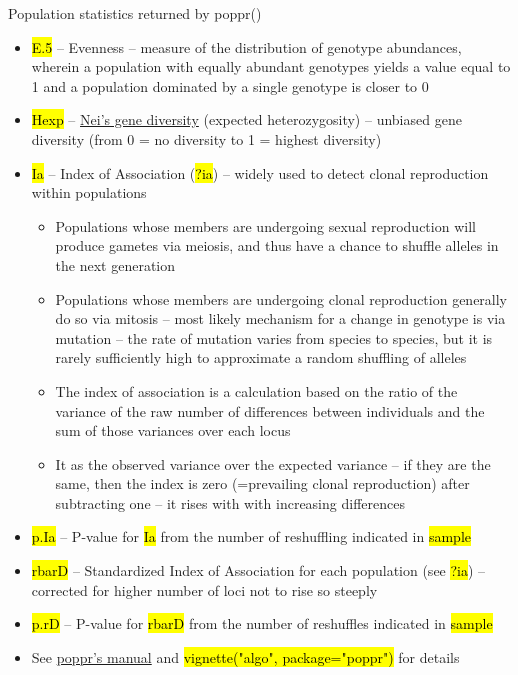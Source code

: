 \documentclass[compress, ucs, xelatex, 11pt, xcolor=svgnames,
  hyperref={
    bookmarks=true,
    unicode=true,
    colorlinks=true,
    pdftitle={Molecular data in R},
    plainpages=false,
    pdfauthor={Vojtech Zeisek},
    pdfsubject={Course about phylogeny and evolution in R},
    pdfcreator={XeLaTeX},
    pdfkeywords={R, evolution, phylogeny, molecular data},
    linkcolor=Tomato,
    anchorcolor=SaddleBrown,
    citecolor=Goldenrod,
    filecolor=DarkMagenta,
    menucolor=Sienna,
    urlcolor=DarkTurquoise,
    pdftex},
  url={hyphens, lowtilde} %
  ]{beamer}
\renewcommand{\texttt}[1]{\hl{\ttfamily #1}}
\begin{document}
\begin{frame}[allowframebreaks]{Population statistics returned by poppr()}
\begin{itemize}
    \item \texttt{E.5} -- Evenness -- measure of the distribution of genotype abundances, wherein a population with equally abundant genotypes yields a value equal to 1 and a population dominated by a single genotype is closer to 0
    \item \texttt{Hexp} -- \href{http://www.genetics.org/content/89/3/583}{Nei's gene diversity} (expected heterozygosity) -- unbiased gene diversity (from 0 = no diversity to 1 = highest diversity)
    \item \texttt{Ia} -- Index of Association (\texttt{?ia}) -- widely used to detect clonal reproduction within populations
    \begin{itemize}
      \item Populations whose members are undergoing sexual reproduction will produce gametes via meiosis, and thus have a chance to shuffle alleles in the next generation
      \item Populations whose members are undergoing clonal reproduction generally do so via mitosis -- most likely mechanism for a change in genotype is via mutation -- the rate of mutation varies from species to species, but it is rarely sufficiently high to approximate a random shuffling of alleles
      \item The index of association is a calculation based on the ratio of the variance of the raw number of differences between individuals and the sum of those variances over each locus
      \item It as the observed variance over the expected variance -- if they are the same, then the index is zero (=prevailing clonal reproduction) after subtracting one -- it rises with with increasing differences
    \end{itemize}
    \item \texttt{p.Ia} -- P-value for \texttt{Ia} from the number of reshuffling indicated in \texttt{sample}
    \item \texttt{rbarD} -- Standardized Index of Association for each population (see \texttt{?ia}) -- corrected for higher number of loci not to rise so steeply
    \item \texttt{p.rD} -- P-value for \texttt{rbarD} from the number of reshuffles indicated in \texttt{sample}
    \item See \href{https://grunwaldlab.github.io/Population_Genetics_in_R/index.html}{poppr's manual} and \texttt{vignette("algo", package="poppr")} for details
  \end{itemize}
\end{frame}
\end{document}

